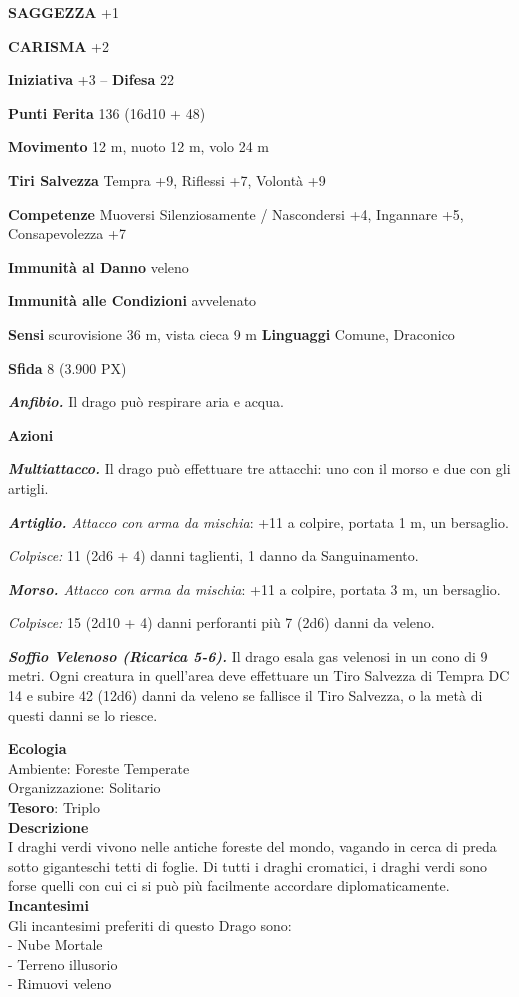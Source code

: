 \begin{multicols}{2}
\textbf{SAGGEZZA} +1

\textbf{CARISMA} +2

\textbf{Iniziativa} +3 -- \textbf{Difesa} 22

\textbf{Punti Ferita} 136 (16d10 + 48)

\textbf{Movimento} 12 m, nuoto 12 m, volo 24 m

\textbf{Tiri Salvezza} Tempra +9, Riflessi +7, Volontà +9

\textbf{Competenze} Muoversi Silenziosamente / Nascondersi +4, Ingannare +5, Consapevolezza +7

\textbf{Immunità al Danno} veleno

\textbf{Immunità alle Condizioni} avvelenato

\textbf{Sensi} scurovisione 36 m, vista cieca 9 m
\textbf{Linguaggi} Comune, Draconico

\textbf{Sfida} 8 (3.900 PX)

\textit{\textbf{Anfibio.}} Il drago può respirare aria e acqua.

\textbf{Azioni}

\textit{\textbf{Multiattacco.}} Il drago può effettuare tre attacchi: uno con il morso e due con gli artigli.

\textit{\textbf{Artiglio.} Attacco con arma da mischia}: +11 a colpire, portata 1 m, un bersaglio.

\textit{Colpisce:} 11 (2d6 + 4) danni taglienti, 1 danno da Sanguinamento.

\textit{\textbf{Morso.} Attacco con arma da mischia}: +11 a colpire, portata 3 m, un bersaglio.

\textit{Colpisce:} 15 (2d10 + 4) danni perforanti più 7 (2d6) danni da veleno.

\textit{\textbf{Soffio Velenoso (Ricarica 5-6).}} Il drago esala gas velenosi in un cono di 9 metri. Ogni creatura in quell'area deve effettuare un Tiro Salvezza di Tempra DC 14 e subire 42 (12d6) danni da veleno se fallisce il Tiro Salvezza, o la metà di questi danni se lo riesce.

\textbf{Ecologia}\\
Ambiente: Foreste Temperate\\
Organizzazione: Solitario\\
\textbf{Tesoro}: Triplo\\
\textbf{Descrizione}\\
I draghi verdi vivono nelle antiche foreste del mondo, vagando in cerca di preda sotto giganteschi tetti di foglie. Di tutti i draghi cromatici, i draghi verdi sono forse quelli con cui ci si può più facilmente accordare diplomaticamente.\\
\textbf{Incantesimi}\\
Gli incantesimi preferiti di questo Drago sono:\\
- Nube Mortale\\
- Terreno illusorio\\
- Rimuovi veleno


\end{multicols}
